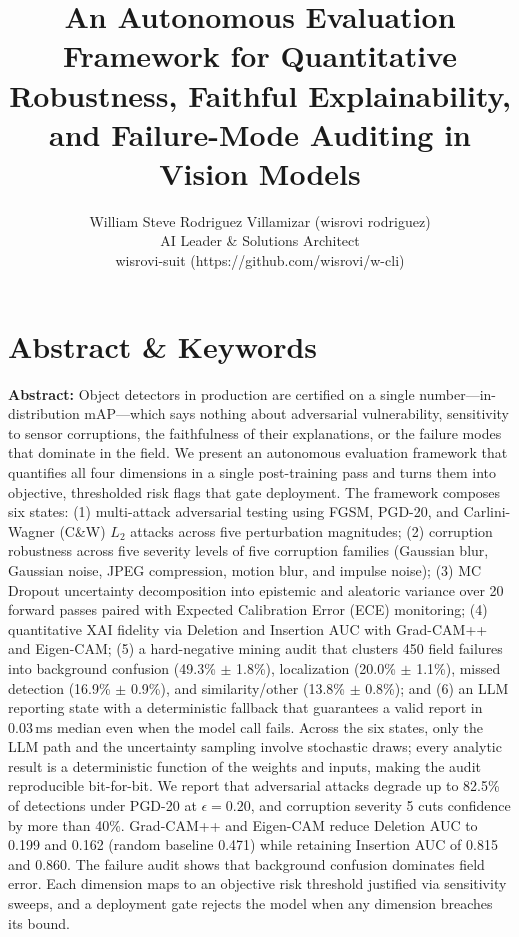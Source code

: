 \documentclass[10pt,twocolumn,letterpaper]{article}
\title{An Autonomous Evaluation Framework for Quantitative Robustness, Faithful Explainability, and Failure-Mode Auditing in Vision Models}
\author{William Steve Rodriguez Villamizar (wisrovi rodriguez)\\AI Leader \& Solutions Architect\\wisrovi-suit (https://github.com/wisrovi/w-cli)}
\date{}
\begin{document}
\maketitle

\section{Abstract \& Keywords}
\textbf{Abstract:} Object detectors in production are certified on a single number---in-distribution mAP---which says nothing about adversarial vulnerability, sensitivity to sensor corruptions, the faithfulness of their explanations, or the failure modes that dominate in the field. We present an autonomous evaluation framework that quantifies all four dimensions in a single post-training pass and turns them into objective, thresholded risk flags that gate deployment. The framework composes six states: (1) multi-attack adversarial testing using FGSM, PGD-20, and Carlini-Wagner (C\&W) $L_2$ attacks across five perturbation magnitudes; (2) corruption robustness across five severity levels of five corruption families (Gaussian blur, Gaussian noise, JPEG compression, motion blur, and impulse noise); (3) MC Dropout uncertainty decomposition into epistemic and aleatoric variance over 20 forward passes paired with Expected Calibration Error (ECE) monitoring; (4) quantitative XAI fidelity via Deletion and Insertion AUC with Grad-CAM++ and Eigen-CAM; (5) a hard-negative mining audit that clusters 450 field failures into background confusion (49.3\% $\pm$ 1.8\%), localization (20.0\% $\pm$ 1.1\%), missed detection (16.9\% $\pm$ 0.9\%), and similarity/other (13.8\% $\pm$ 0.8\%); and (6) an LLM reporting state with a deterministic fallback that guarantees a valid report in 0.03\,ms median even when the model call fails. Across the six states, only the LLM path and the uncertainty sampling involve stochastic draws; every analytic result is a deterministic function of the weights and inputs, making the audit reproducible bit-for-bit. We report that adversarial attacks degrade up to 82.5\% of detections under PGD-20 at $\epsilon=0.20$, and corruption severity 5 cuts confidence by more than 40\%. Grad-CAM++ and Eigen-CAM reduce Deletion AUC to 0.199 and 0.162 (random baseline 0.471) while retaining Insertion AUC of 0.815 and 0.860. The failure audit shows that background confusion dominates field error. Each dimension maps to an objective risk threshold justified via sensitivity sweeps, and a deployment gate rejects the model when any dimension breaches its bound.
\end{document}
